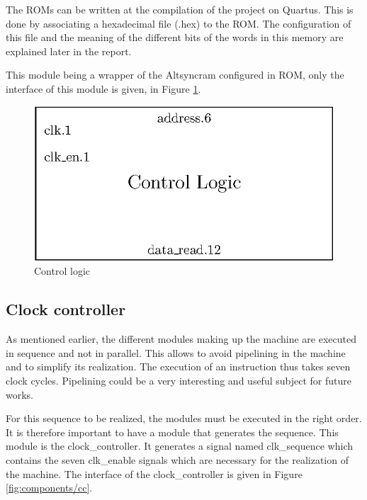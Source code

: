 The ROMs can be written at the compilation of the project on Quartus. This is done by associating a
hexadecimal file (.hex) to the ROM. The configuration of this file and the meaning of the different 
bits of the words in this memory are explained later in the report. 

This module being a wrapper of the Altsyncram configured in ROM, only the interface of this 
module is given, in Figure \ref{fig:components/cl}.

\begin{figure}[H]
    \centering
    \includegraphics[scale=1]{Chapter3-CPU/res/control_logic}
    \caption{Control logic}
    \label{fig:components/cl}
\end{figure}

\subsection{Clock controller}

As mentioned earlier, the different modules making up the machine are executed in sequence and not 
in parallel. This allows to avoid pipelining in the machine and to simplify its realization. The 
execution of an instruction thus takes seven clock cycles. Pipelining could be a very interesting 
and useful subject for future works. 

For this sequence to be realized, the modules must be executed in the right order. It is therefore 
important to have a module that generates the sequence. This module is the clock\_controller. It
generates a signal named clk\_sequence which contains the seven clk\_enable signals which are 
necessary for the realization of the machine. The interface of the clock\_controller is given in
Figure \ref{fig:components/cc}. 

